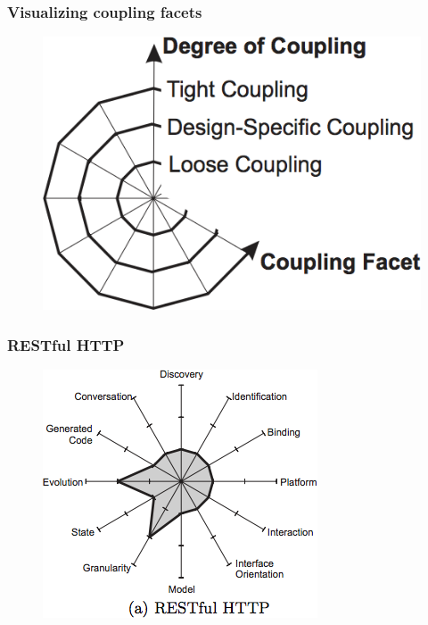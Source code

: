 \documentclass{beamer}
\begin{document}
\begin{frame}
    \frametitle{Visualizing coupling facets}
    \begin{figure}
        \centering
        \includegraphics[height=0.6\paperheight]{fig3-0.png}
    \end{figure}
\end{frame}

\begin{frame}
    \frametitle{RESTful HTTP}
    \begin{figure}
        \centering
        \includegraphics[height=0.6\paperheight]{fig3-1.png}
    \end{figure}
\end{frame}
\end{document}
